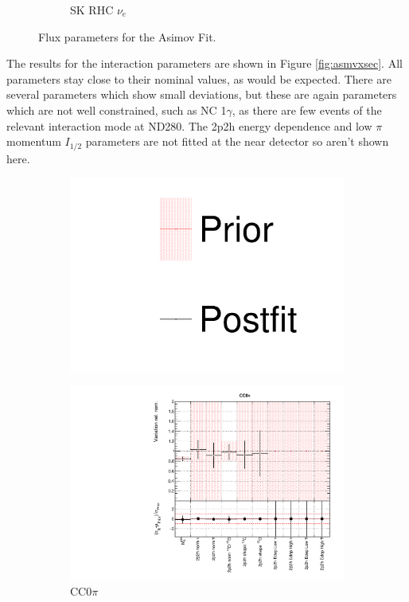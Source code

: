 \begin{figure}
\begin{subfigure}{0.24\textwidth}
  \caption{SK RHC $\nu_e$}
  \label{fig:}
\end{subfigure}
\caption{Flux parameters for the Asimov Fit.}
\label{fig:asmvfluxSK}
\end{figure}

The results for the interaction parameters are shown in Figure \ref{fig:asmvxsec}. All parameters stay close to their nominal values, as would be expected. There are several parameters which show small deviations, but these are again parameters which are not well constrained, such as NC 1$\gamma$, as there are few events of the relevant interaction mode at ND280. The 2p2h energy dependence and low $\pi$ momentum $I_{1/2}$ parameters are not fitted at the near detector so aren't shown here.

\begin{figure}
\centering
\begin{subfigure}{0.95\textwidth}
  \centering
  \includegraphics[width=0.25\linewidth]{figs/asmv_leg}
\end{subfigure}
\begin{subfigure}{0.49\textwidth}
  \centering
  \includegraphics[width=0.95\linewidth]{figs/asmvxsec1}
  \caption{CC0$\pi$}
  \label{fig:}
\end{subfigure}
\begin{subfigure}{0.49\textwidth}
  \centering

\end{subfigure}
\end{figure}

